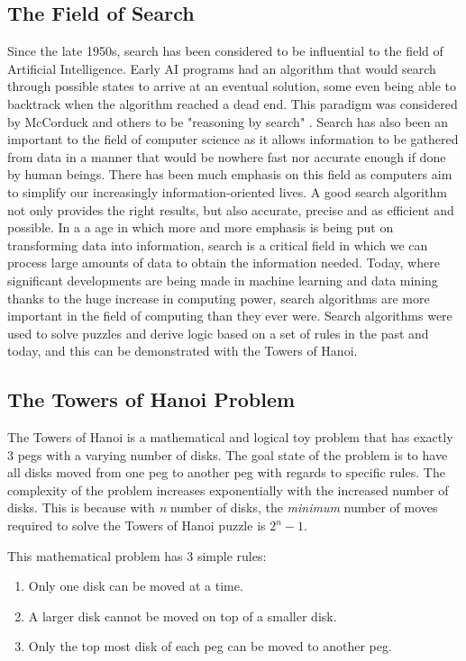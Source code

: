 \documentclass[conference]{IEEEtran}
\begin{document}
\subsection{The Field of Search}
Since the late 1950s, search has been considered to be influential to the field of Artificial Intelligence. Early AI programs had an algorithm that would search through possible states to arrive at an eventual solution, some even being able to backtrack when the algorithm reached a dead end. This paradigm was considered by McCorduck and others to be "reasoning by search" \cite{McCorduck01}. Search has also been an important to the field of computer science as it allows information to be gathered from data in a manner that would be nowhere fast nor accurate enough if done by human beings. There has been much emphasis on this field as computers aim to simplify our increasingly information-oriented lives. A good search algorithm not only provides the right results, but also accurate, precise and as efficient and possible. In a a age in which more and more emphasis is being put on transforming data into information, search is a critical field in which we can process large amounts of data to obtain the information needed. Today, where significant developments are being made in machine learning and data mining thanks to the huge increase in computing power, search algorithms are more important in the field of computing than they ever were. Search algorithms were used to solve puzzles and derive logic based on a set of rules in the past and today, and this can be demonstrated with the Towers of Hanoi.

\subsection{The Towers of Hanoi Problem}

The Towers of Hanoi is a mathematical and logical toy problem that has exactly 3 pegs with a varying number of disks. The goal state of the problem is to have all disks moved from one peg to another peg with regards to specific rules. The complexity of the problem increases exponentially with the increased number of disks. This is because with \textit {n} number of disks, the \textit{minimum} number of moves required to solve the Towers of Hanoi puzzle is $2^{n} - 1$. \cite{FamousPuzzles}

This mathematical problem has 3 simple rules:

\begin{enumerate}
\item Only one disk can be moved at a time.
\item A larger disk cannot be moved on top of a smaller disk.
\item Only the top most disk of each peg can be moved to another peg. 
\end{enumerate}
\end{document}
